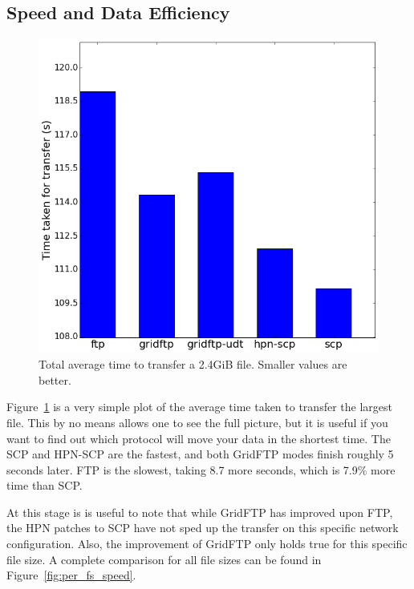 \documentclass{sig-alternate-05-2015}
\begin{document}
\subsection{Speed and Data Efficiency}

\begin{figure}[h]
\centering
	\includegraphics[width=.8\linewidth]{img/time.png}
\caption{Total average time to transfer a 2.4GiB file. Smaller values are better.}
\label{fig:time}
\end{figure}

Figure~\ref{fig:time} is a very simple plot of the average time taken to transfer the largest file. This by no means allows one to see the full picture, but it is useful if you want to find out which protocol will move your data in the shortest time. The SCP and HPN-SCP are the fastest, and both GridFTP modes finish roughly 5 seconds later. FTP is the slowest, taking 8.7 more seconds, which is 7.9\% more time than SCP.

At this stage is is useful to note that while GridFTP has improved upon FTP, the HPN patches to SCP have not sped up the transfer on this specific network configuration. Also, the improvement of GridFTP only holds true for this specific file size. A complete comparison for all file sizes can be found in Figure~\ref{fig:per_fs_speed}.
\end{document}
